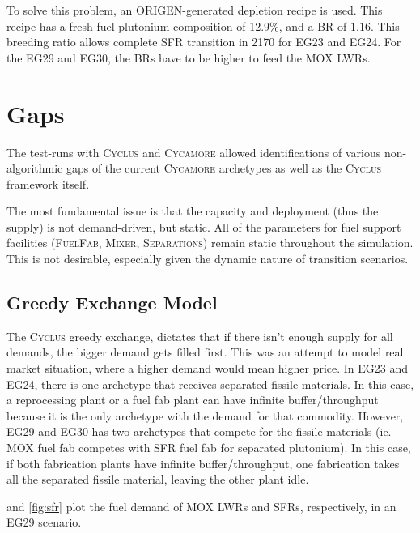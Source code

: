 \documentclass{article}
\newcommand{\Cyclus}{\textsc{Cyclus}\xspace}%
\newcommand{\Cycamore}{\textsc{Cycamore}\xspace}%
\begin{document}
To solve this problem, an ORIGEN-generated depletion recipe is used. This recipe
has a fresh fuel plutonium composition of 12.9\%, and a BR of $1.16$. This breeding
ratio allows complete SFR transition in 2170 for EG23 and EG24. For the EG29 and EG30,
the BRs have to be higher to feed the \gls{MOX} \glspl{LWR}. 


\section{Gaps}
The test-runs with \Cyclus and \Cycamore allowed identifications of various non-algorithmic gaps
of the current \Cycamore archetypes as well as the \Cyclus framework itself. 

The most fundamental issue is that the capacity and deployment (thus the supply) is not
demand-driven, but static. All of the parameters for fuel support facilities (\textsc{FuelFab}\xspace,
\textsc{Mixer}\xspace, \textsc{Separations}\xspace) remain static throughout the simulation.
This is not desirable, especially given the dynamic nature of transition scenarios. 

\subsection{Greedy Exchange Model}
The \Cyclus greedy exchange,
dictates that if there isn't enough supply for all demands, the bigger demand gets filled first.
This was an attempt to model real market situation, where a higher demand would mean higher price. 
In EG23 and EG24,
there is one archetype that receives separated fissile materials. In this case, a reprocessing
plant or a fuel fab plant can have infinite buffer/throughput because it is the only
archetype with the demand for that commodity. However, EG29 and EG30 has two archetypes
that compete for the fissile materials (ie. \gls{MOX} fuel fab competes with \gls{SFR} fuel fab for separated plutonium).
In this case, if both fabrication plants have infinite buffer/throughput, one fabrication takes all the
separated fissile material, leaving the other plant idle.

 and \cref{fig:sfr} plot the fuel demand of \gls{MOX} \glspl{LWR} and \glspl{SFR},
respectively, in an EG29 scenario.
\end{document}
